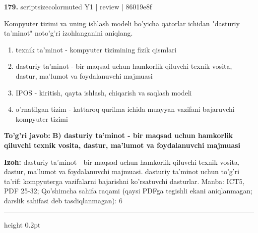\documentclass[10pt,a4paper]{article}
\begin{document}
{\bfseries\sffamily\color{ink} 179.} {scriptsizecolor{muted} Y1 | review | 86019e8f}
\par
Kompyuter tizimi va uning ishlash modeli bo'yicha qatorlar ichidan "dasturiy ta'minot" noto'g'ri izohlanganini aniqlang.
\begin{enumerate}[label=\Alph*),leftmargin=9mm]
\item texnik ta'minot - kompyuter tizimining fizik qismlari
\item dasturiy ta'minot - bir maqsad uchun hamkorlik qiluvchi texnik vosita, dastur, ma'lumot va foydalanuvchi majmuasi
\item IPOS - kiritish, qayta ishlash, chiqarish va saqlash modeli
\item o'rnatilgan tizim - kattaroq qurilma ichida muayyan vazifani bajaruvchi kompyuter tizimi
\end{enumerate}
\begin{tcolorbox}[enhanced,breakable,colback=teal!4,colframe=teal!60!black,boxrule=0.45pt,arc=1.2mm,left=2.7mm,right=2.7mm,top=1.8mm,bottom=1.8mm,before skip=2mm,after skip=2mm]
{\bfseries\sffamily\color{teal}To'g'ri javob:} \textbf{B) dasturiy ta'minot - bir maqsad uchun hamkorlik qiluvchi texnik vosita, dastur, ma'lumot va foydalanuvchi majmuasi}
\par\smallskip
{\bfseries Izoh:} dasturiy ta'minot - bir maqsad uchun hamkorlik qiluvchi texnik vosita, dastur, ma'lumot va foydalanuvchi majmuasi. dasturiy ta'minot uchun to'g'ri ta'rif: kompyuterga vazifalarni bajarishni ko'rsatuvchi dasturlar. Manba: ICT5, PDF 25-32; Qo'shimcha sahifa raqami (qaysi PDFga tegishli ekani aniqlanmagan; darslik sahifasi deb tasdiqlanmagan): 6
\end{tcolorbox}
\vspace{2mm}\hrule height 0.2pt\vspace{3mm}
\end{document}
